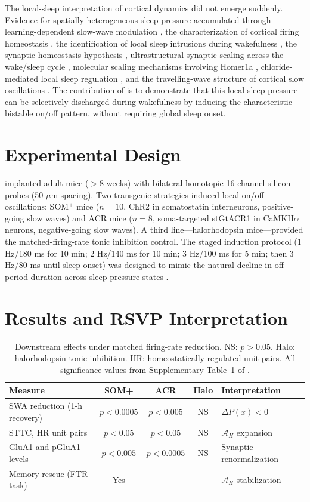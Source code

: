 \documentclass[12pt, a4paper, twoside]{book}
\theoremstyle{definition}
\theoremstyle{remark}
\newcommand{\Adm}{\mathcal{A}}
\newcommand{\slp}{P}
\begin{document}
The local-sleep interpretation of cortical dynamics did not emerge suddenly. Evidence for spatially heterogeneous sleep pressure accumulated through learning-dependent slow-wave modulation \citep{huber2004}, the characterization of cortical firing homeostasis \citep{vyazovskiy2009}, the identification of local sleep intrusions during wakefulness \citep{vyazovskiy2011}, the synaptic homeostasis hypothesis \citep{tononi2014, tononi2020}, ultrastructural synaptic scaling across the wake/sleep cycle \citep{devivo2017}, molecular scaling mechanisms involving Homer1a \citep{diering2017}, chloride-mediated local sleep regulation \citep{alfonsa2023}, and the travelling-wave structure of cortical slow oscillations \citep{massimini2004}. The contribution of \citet{driessen2026} is to demonstrate that this local sleep pressure can be selectively discharged during wakefulness by inducing the characteristic bistable on/off pattern, without requiring global sleep onset.

\section{Experimental Design}

\citet{driessen2026} implanted adult mice ($>8$ weeks) with bilateral homotopic 16-channel silicon probes (50 $\mu$m spacing). Two transgenic strategies induced local on/off oscillations: SOM$^+$ mice ($n=10$, ChR2 in somatostatin interneurons, positive-going slow waves) and ACR mice ($n=8$, soma-targeted stGtACR1 in CaMKII$\alpha$ neurons, negative-going slow waves). A third line---halorhodopsin mice---provided the matched-firing-rate tonic inhibition control. The staged induction protocol (1 Hz/180 ms for 10 min; 2 Hz/140 ms for 10 min; 3 Hz/100 ms for 5 min; then 3 Hz/80 ms until sleep onset) was designed to mimic the natural decline in off-period duration across sleep-pressure states \citep{vyazovskiy2009}.

\section{Results and RSVP Interpretation}

\begin{longtable}{p{5cm}cccl}
\toprule
\textbf{Measure} & \textbf{SOM+} & \textbf{ACR} & \textbf{Halo} & \textbf{Interpretation}\\
\midrule
SWA reduction (1-h recovery) & $p{<}0.0005$ & $p{<}0.005$ & NS & $\Delta\slp(x) < 0$ \\
STTC, HR unit pairs & $p{<}0.05$ & $p{<}0.05$ & NS & $\Adm_H$ expansion \\
GluA1 and pGluA1 levels & $p{<}0.005$ & $p{<}0.0005$ & NS & Synaptic renormalization \\
Memory rescue (FTR task) & Yes & --- & --- & $\Adm_H$ stabilization \\
\bottomrule
\caption{Downstream effects under matched firing-rate reduction. NS: $p > 0.05$. Halo: halorhodopsin tonic inhibition. HR: homeostatically regulated unit pairs. All significance values from Supplementary Table~1 of \citet{driessen2026}.}
\label{tab:cortical}
\end{longtable}
\end{document}
